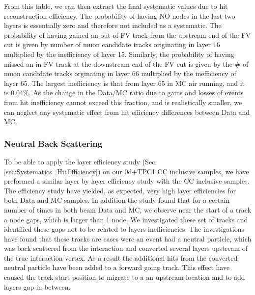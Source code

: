 From this table, we can then extract the final systematic values due to hit reconstruction efficiency. The probability of having NO nodes in the last two layers is essentially zero and therefore not included as a systematic. The probability of having gained an out-of-FV track from the upstream end of the FV cut is given by number of muon candidate tracks originating in layer 16 multiplied by the inefficiency of layer 15. Similarly, the probability of having missed an in-FV track at the downstream end of the FV cut is given by the \# of muon candidate tracks orginating in layer 66 multiplied by the inefficiency of layer 65. The largest inefficiency is that from layer 65 in MC air running, and it is 0.04$\%$. As the change in the Data/MC ratio due to gains and losses of events from hit inefficiency cannot exceed this fraction, and is realistically smaller, we can neglect any systematic effect from hit efficiency differences between Data and MC.

\subsubsection{Neutral Back Scattering}

To be able to apply the layer efficiency study 
(Sec. \ref{sec:Systematics_HitEfficiency})
on our \p0d+TPC1 CC inclusive samples, we have preformed a similar 
layer by layer efficiency study with the CC inclusive samples. 
The efficiency study have yielded, as expected, 
very high layer efficiencies for 
both Data and MC samples.
In addition the study found that for 
a certain number of times in both beam Data and MC, 
we observe 
near the start of a track a node gaps, which is larger than 1 node.
We investigated these set of tracks and identified these 
gaps not to be related to layers inefficiencies. 
The investigations have found that these tracks are 
cases were an event had a
neutral particle, which was back scattered from 
the interaction and converted several layers upstream 
of the true interaction vertex. 
As a result the additional hits from the converted neutral particle 
have been added to a forward going track. 
This effect have caused the track start position to migrate  
to a an upstream location and to add layers gap in between.\\


